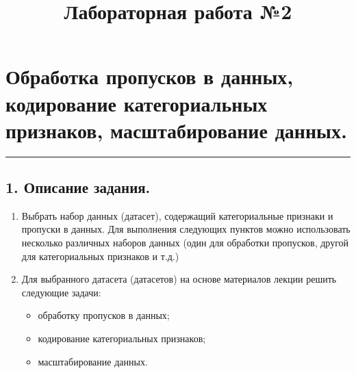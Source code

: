 \documentclass[11pt]{article}
\title{Лабораторная работа №2}
\providecommand{\tightlist}{%
      \setlength{\itemsep}{0pt}\setlength{\parskip}{0pt}}
\begin{document}
    
    \maketitle
    
    

    
    \hypertarget{ux43eux431ux440ux430ux431ux43eux442ux43aux430-ux43fux440ux43eux43fux443ux441ux43aux43eux432-ux432-ux434ux430ux43dux43dux44bux445-ux43aux43eux434ux438ux440ux43eux432ux430ux43dux438ux435-ux43aux430ux442ux435ux433ux43eux440ux438ux430ux43bux44cux43dux44bux445-ux43fux440ux438ux437ux43dux430ux43aux43eux432-ux43cux430ux441ux448ux442ux430ux431ux438ux440ux43eux432ux430ux43dux438ux435-ux434ux430ux43dux43dux44bux445.}{%
\section{Обработка пропусков в данных, кодирование категориальных
признаков, масштабирование
данных.}\label{ux43eux431ux440ux430ux431ux43eux442ux43aux430-ux43fux440ux43eux43fux443ux441ux43aux43eux432-ux432-ux434ux430ux43dux43dux44bux445-ux43aux43eux434ux438ux440ux43eux432ux430ux43dux438ux435-ux43aux430ux442ux435ux433ux43eux440ux438ux430ux43bux44cux43dux44bux445-ux43fux440ux438ux437ux43dux430ux43aux43eux432-ux43cux430ux441ux448ux442ux430ux431ux438ux440ux43eux432ux430ux43dux438ux435-ux434ux430ux43dux43dux44bux445.}}

\begin{center}\rule{0.5\linewidth}{0.5pt}\end{center}

\hypertarget{ux43eux43fux438ux441ux430ux43dux438ux435-ux437ux430ux434ux430ux43dux438ux44f.}{%
\subsection{1. Описание
задания.}\label{ux43eux43fux438ux441ux430ux43dux438ux435-ux437ux430ux434ux430ux43dux438ux44f.}}

\begin{enumerate}
\def\labelenumi{\arabic{enumi}.}
\tightlist
\item
  Выбрать набор данных (датасет), содержащий категориальные признаки и
  пропуски в данных. Для выполнения следующих пунктов можно использовать
  несколько различных наборов данных (один для обработки пропусков,
  другой для категориальных признаков и т.д.)
\item
  Для выбранного датасета (датасетов) на основе материалов лекции решить
  следующие задачи:

  \begin{itemize}
  \tightlist
  \item
    обработку пропусков в данных;
  \item
    кодирование категориальных признаков;
  \item
    масштабирование данных.
  \end{itemize}
\end{enumerate}
\end{document}
